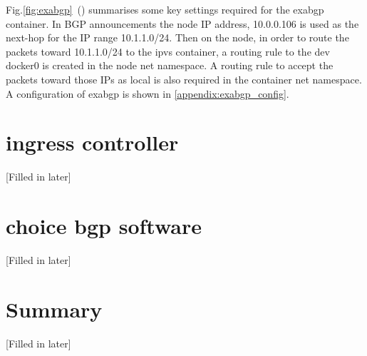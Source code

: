 Fig.\ref{fig:exabgp}~() summarises some key settings required for the exabgp container.
In BGP announcements the node IP address, 10.0.0.106 is used as the next-hop for the IP range 10.1.1.0/24.
Then on the node, in order to route the packets toward 10.1.1.0/24 to the ipvs container, 
a routing rule to the dev docker0 is created in the node net namespace. 
A routing rule to accept the packets toward those IPs as local is also required in the container net namespace. 
A configuration of exabgp is shown in \ref{appendix:exabgp_config}.

\section{ingress controller}
[Filled in later]

\section{choice bgp software}
[Filled in later]

\section{Summary}
[Filled in later]

